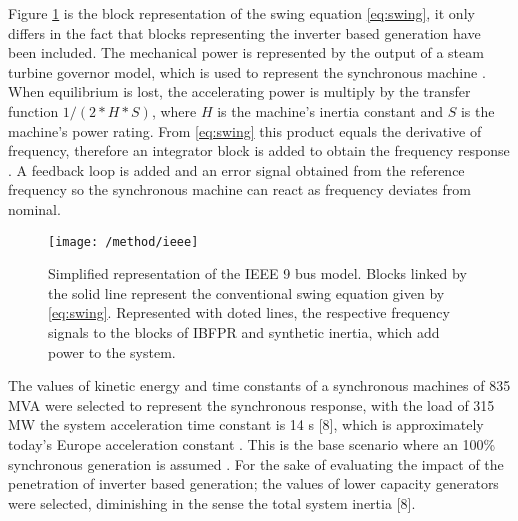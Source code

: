 Figure \ref{fig:ieeesimple} is the block representation of the swing equation \eqref{eq:swing}, it only differs in the fact that blocks representing the inverter based generation have been included. The mechanical power is represented by the output of a steam turbine governor model, which is used to represent the synchronous machine \cite{Anderson.2002}. When equilibrium is lost, the accelerating power is multiply by the transfer function $ 1/(2*H*S) $, where $ H $ is the machine’s inertia constant and $ S $ is the machine’s power rating. From \eqref{eq:swing} this product equals the derivative of frequency, therefore an integrator block is added to obtain the frequency response \cite{kundur1994power}\cite{john1994power}\cite{ogata1999ingenieria}. A feedback loop is added and an error signal obtained from the reference frequency so the synchronous machine can react as frequency deviates from nominal. \\ 

\begin{figure}[h]
	\centering
	\texttt{[image: /method/ieee]}
	\caption{Simplified representation of the IEEE 9 bus model. Blocks linked by the solid line represent the conventional swing equation given by \eqref{eq:swing}. Represented with doted lines, the respective frequency signals to the blocks of IBFPR and synthetic inertia, which add power to the system.}
	\label{fig:ieeesimple}
\end{figure}


The values of kinetic energy and time constants of a synchronous machines of 835 MVA were selected to represent the synchronous response, with the load of 315 MW the system acceleration time constant is 14 s [8], which is approximately today’s Europe acceleration constant \cite{ENTSOE.2016}. This is the base scenario where an 100\% synchronous generation is assumed . For the sake of evaluating the impact of the penetration of inverter based generation; the values of lower capacity generators were selected, diminishing in the sense the total system inertia \cite{Anderson.2002}[8].\\%





